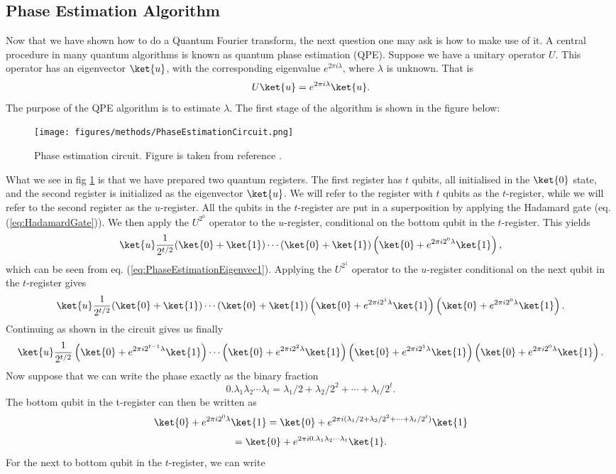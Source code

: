 \subsection{Phase Estimation Algorithm}
\label{subsec:PhaseEstimation}

Now that we have shown how to do a Quantum Fourier transform, the next question one may ask is how to make use of it. A central procedure in many quantum algorithms is known as quantum phase estimation (QPE). Suppose we have a unitary operator $U$. This operator has an eigenvector $\ket{u}$, with the corresponding eigenvalue $e^{2 \pi i \lambda }$, where $\lambda$ is unknown. That is
\begin{equation}
    \label{eq:PhaseEstimationEigenvec1}
    U\ket{u} = e^{2\pi i \lambda} \ket{u}.
\end{equation}
The purpose of the QPE algorithm is to estimate $\lambda$. The first stage of the algorithm is shown in the figure below:

\begin{figure}[H]
    \centering
    \texttt{[image: figures/methods/PhaseEstimationCircuit.png]}
    \caption{Phase estimation circuit. Figure is taken from reference \cite{NielsenAndChuang}.}
    \label{fig:QPECircuit}
\end{figure}

What we see in fig \ref{fig:QPECircuit} is that we have prepared two quantum registers. The first register has $t$ qubits, all initialised in the $\ket{0}$ state, and the second register is initialized as the eigenvector $\ket{u}$. We will refer to the register with $t$ qubits as the $t$-register, while we will refer to the second register as the $u$-register. All the qubits in the $t$-register are put in a superposition by applying the Hadamard gate (eq. (\ref{eq:HadamardGate})). We then apply the $U^{2^0}$ operator to the $u$-register, conditional on the bottom qubit in the $t$-register. This yields
$$\ket{u}\frac{1}{2^{t/2}} (\ket{0} + \ket{1})\cdots(\ket{0} + \ket{1}) \left( \ket{0} + e^{2\pi i 2^0 \lambda}\ket{1} \right),$$
which can be seen from eq. (\ref{eq:PhaseEstimationEigenvec1}).
Applying the $U^{2^1}$ operator to the $u$-register conditional on the next qubit in the $t$-register gives
$$\ket{u}\frac{1}{2^{t/2}}(\ket{0} + \ket{1})\cdots(\ket{0} + \ket{1})  \left( \ket{0} + e^{2\pi i 2^1 \lambda}\ket{1} \right)\left( \ket{0} + e^{2\pi i 2^0 \lambda}\ket{1} \right). $$
Continuing as shown in the circuit gives us finally
$$\ket{u}\frac{1}{2^{t/2}} \left( \ket{0} + e^{2\pi i 2^{t-1}  \lambda}\ket{1} \right)\cdots \left( \ket{0} + e^{2\pi i 2^2 \lambda}\ket{1} \right) \left( \ket{0} + e^{2\pi i 2^1 \lambda}\ket{1} \right)\left( \ket{0} + e^{2\pi i 2^0 \lambda}\ket{1} \right). $$
Now suppose that we can write the phase exactly as the binary fraction $$0.\lambda_1 \lambda_2 \cdots \lambda_t = \lambda_1/2 +  \lambda_2/2^2  + \cdots + \lambda_t /2^t.$$
The bottom qubit in the t-register can then be written as
$$ \ket{0} + e^{2\pi i 2^0 \lambda}\ket{1} = \ket{0} + e^{2\pi i (\lambda_1/2 +  \lambda_2/2^2  + \cdots + \lambda_t /2^t)}\ket{1} $$
$$= \ket{0} + e^{2\pi i 0.\lambda_1 \lambda_2 \cdots \lambda_t}\ket{1}. $$
For the next to bottom qubit in the $t$-register, we can write

